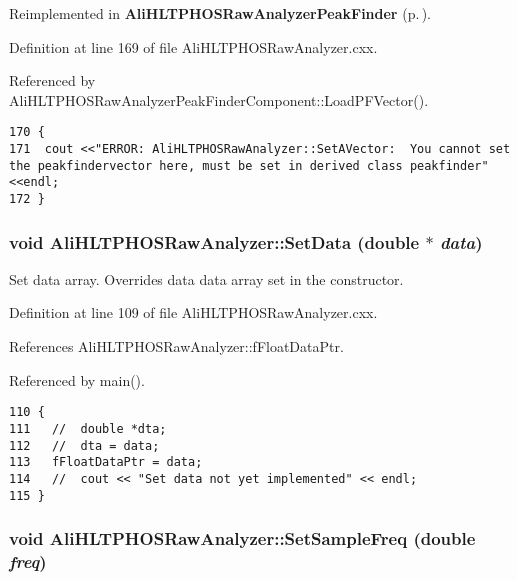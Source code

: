 Reimplemented in {\bf Ali\-HLTPHOSRaw\-Analyzer\-Peak\-Finder} {\rm (p.\,\pageref{classAliHLTPHOSRawAnalyzerPeakFinder_AliHLTPHOSRawAnalyzerPeakFindera5})}.

Definition at line 169 of file Ali\-HLTPHOSRaw\-Analyzer.cxx.

Referenced by Ali\-HLTPHOSRaw\-Analyzer\-Peak\-Finder\-Component::Load\-PFVector().

\footnotesize\begin{verbatim}170 {
171  cout <<"ERROR: AliHLTPHOSRawAnalyzer::SetAVector:  You cannot set the peakfindervector here, must be set in derived class peakfinder"<<endl;
172 }
\end{verbatim}\normalsize 


\subsubsection{\setlength{\rightskip}{0pt plus 5cm}void Ali\-HLTPHOSRaw\-Analyzer::Set\-Data (double $\ast$ {\em data})\hspace{0.3cm}{\tt  [inherited]}}\label{classAliHLTPHOSRawAnalyzer_AliHLTPHOSRawAnalyzerPeakFindera12}


Set data array. Overrides data data array set in the constructor. 

Definition at line 109 of file Ali\-HLTPHOSRaw\-Analyzer.cxx.

References Ali\-HLTPHOSRaw\-Analyzer::f\-Float\-Data\-Ptr.

Referenced by main().

\footnotesize\begin{verbatim}110 {
111   //  double *dta;
112   //  dta = data;
113   fFloatDataPtr = data;
114   //  cout << "Set data not yet implemented" << endl;
115 }
\end{verbatim}\normalsize 


\subsubsection{\setlength{\rightskip}{0pt plus 5cm}void Ali\-HLTPHOSRaw\-Analyzer::Set\-Sample\-Freq (double {\em freq})\hspace{0.3cm}{\tt  [inherited]}}\label{classAliHLTPHOSRawAnalyzer_AliHLTPHOSRawAnalyzerPeakFindera13}





